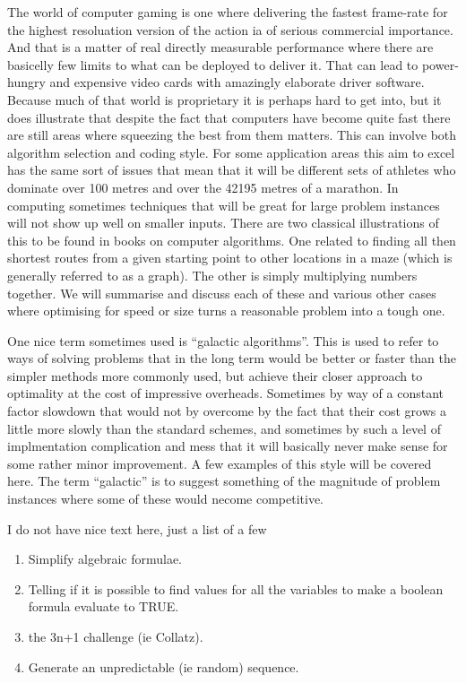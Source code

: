 \begin{longdescription}
The world of computer gaming is one where delivering the fastest 
frame-rate for the highest resoluation version of the action ia of serious 
commercial importance. And that is a matter of real directly measurable 
performance where there are basicelly few limits to what can be deployed 
to deliver it. That can lead to power-hungry and expensive video cards 
with amazingly elaborate driver software. Because much of that world is 
proprietary it is perhaps hard to get into, but it does illustrate that 
despite the fact that computers have become quite fast there are still 
areas where squeezing the best from them matters. This can involve both 
algorithm selection and coding style. For some application areas this aim
to excel has the same sort of issues that mean that it will be different
sets of athletes who dominate over 100 metres and over the 42195 metres of 
a marathon. In computing sometimes techniques that will be great for large 
problem instances will not show up well on smaller inputs. There are two 
classical illustrations of this to be found in books on computer 
algorithms. One related to finding all then shortest routes from a given 
starting point to other locations in a maze (which is generally referred 
to as a graph). The other is simply multiplying numbers together. We will
summarise and discuss each of these and various other cases where 
optimising for speed or size turns a reasonable problem into a tough one.

One nice term sometimes used is ``galactic algorithms''. This is used
to refer to ways of solving problems that in the long term would be
better or faster than the simpler methods more commonly used, but achieve
their closer approach to optimality at the cost of impressive overheads.
Sometimes by way of a constant factor slowdown that would not by overcome
by the fact that their cost grows a little more slowly than the standard
schemes, and sometimes by such a level of implmentation complication and
mess that it will basically never make sense for some rather minor
improvement. A few examples of this style will be covered here. The
term ``galactic'' is to suggest something of the magnitude of problem
instances where some of these would necome competitive. 

\item[Challenging underpinning theory behind a simple-looking problem]
I do not have nice text here, just a list of a few 
\begin{enumerate}
\item Simplify algebraic formulae.
\item Telling if it is possible to find values for all the variables to
make a boolean formula evaluate to TRUE.
\item the 3n+1 challenge (ie Collatz).
\item Generate an unpredictable (ie random) sequence.
\end{enumerate}


\end{longdescription}
